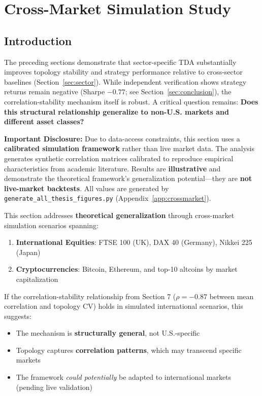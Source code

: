 \section{Cross-Market Simulation Study}
\label{sec:crossmarket}

\subsection{Introduction}

The preceding sections demonstrate that sector-specific TDA substantially improves topology stability and strategy performance relative to cross-sector baselines (Section~\ref{sec:sector}). While independent verification shows strategy returns remain negative (Sharpe $-0.77$; see Section~\ref{sec:conclusion}), the correlation-stability mechanism itself is robust. A critical question remains: \textbf{Does this structural relationship generalize to non-U.S. markets and different asset classes?}

\textbf{Important Disclosure:} Due to data-access constraints, this section uses a \textbf{calibrated simulation framework} rather than live market data. The analysis generates synthetic correlation matrices calibrated to reproduce empirical characteristics from academic literature. Results are \textbf{illustrative} and demonstrate the theoretical framework's generalization potential---they are \textbf{not live-market backtests}. All values are generated by \texttt{generate\_all\_thesis\_figures.py} (Appendix~\ref{app:crossmarket}).

This section addresses \textbf{theoretical generalization} through cross-market simulation scenarios spanning:

\begin{enumerate}
\item \textbf{International Equities}: FTSE 100 (UK), DAX 40 (Germany), Nikkei 225 (Japan)
\item \textbf{Cryptocurrencies}: Bitcoin, Ethereum, and top-10 altcoins by market capitalization
\end{enumerate}

If the correlation-stability relationship from Section 7 ($\rho = -0.87$ between mean correlation and topology CV) holds in simulated international scenarios, this suggests:

\begin{itemize}
\item The mechanism is \textbf{structurally general}, not U.S.-specific
\item Topology captures \textbf{correlation patterns}, which may transcend specific markets
\item The framework \textit{could potentially} be adapted to international markets (pending live validation)
\end{itemize}


